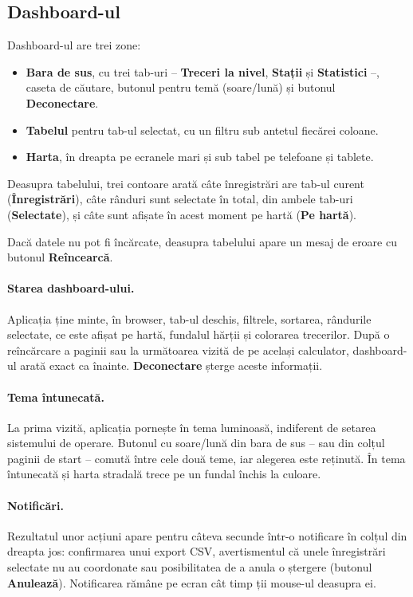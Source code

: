 \documentclass[11pt,a4paper]{article}
\newcommand{\ui}[1]{\textsf{\textbf{#1}}}
\begin{document}
\subsection{Dashboard-ul}

Dashboard-ul are trei zone:

\begin{itemize}
  \item \textbf{Bara de sus}, cu trei tab-uri -- \ui{Treceri la nivel},
        \ui{Stații} și \ui{Statistici} --, caseta de căutare, butonul pentru
        temă (soare/lună) și butonul \ui{Deconectare}.
  \item \textbf{Tabelul} pentru tab-ul selectat, cu un filtru sub antetul
        fiecărei coloane.
  \item \textbf{Harta}, în dreapta pe ecranele mari și sub tabel pe telefoane
        și tablete.
\end{itemize}

Deasupra tabelului, trei contoare arată câte înregistrări are tab-ul curent
(\textbf{Înregistrări}), câte rânduri sunt selectate în total, din ambele
tab-uri (\textbf{Selectate}), și câte sunt afișate în acest moment pe hartă
(\textbf{Pe hartă}).

Dacă datele nu pot fi încărcate, deasupra tabelului apare un mesaj de eroare
cu butonul \ui{Reîncearcă}.

\paragraph{Starea dashboard-ului.} Aplicația ține minte, în browser, tab-ul
deschis, filtrele, sortarea, rândurile selectate, ce este afișat pe hartă,
fundalul hărții și colorarea trecerilor. După o reîncărcare a paginii sau la
următoarea vizită de pe același calculator, dashboard-ul arată exact ca
înainte. \ui{Deconectare} șterge aceste informații.

\paragraph{Tema întunecată.} La prima vizită, aplicația pornește în tema
luminoasă, indiferent de setarea sistemului de operare. Butonul cu soare/lună din
bara de sus -- sau din colțul paginii de start -- comută între cele două teme,
iar alegerea este reținută. În tema întunecată și harta stradală trece pe un
fundal închis la culoare.

\paragraph{Notificări.} Rezultatul unor acțiuni apare pentru câteva secunde
într-o notificare în colțul din dreapta jos: confirmarea unui export CSV,
avertismentul că unele înregistrări selectate nu au coordonate sau
posibilitatea de a anula o ștergere (butonul \ui{Anulează}). Notificarea
rămâne pe ecran cât timp ții mouse-ul deasupra ei.
\end{document}
